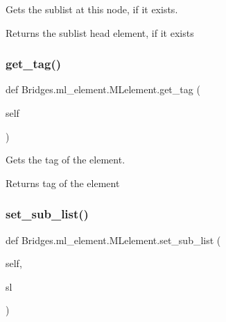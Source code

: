 Gets the sublist at this node, if it exists. 

\begin{DoxyReturn}{Returns}
the sublist head element, if it exists 
\end{DoxyReturn}
\mbox{\label{class_bridges_1_1ml__element_1_1_m_lelement_a4657bdb7c765e5c0dac5e14fb6a61153}} 
\subsubsection{\texorpdfstring{get\+\_\+tag()}{get\_tag()}}
{\footnotesize\ttfamily def Bridges.\+ml\+\_\+element.\+M\+Lelement.\+get\+\_\+tag (\begin{DoxyParamCaption}\item[{}]{self }\end{DoxyParamCaption})}



Gets the tag of the element. 

\begin{DoxyReturn}{Returns}
tag of the element 
\end{DoxyReturn}
\mbox{\label{class_bridges_1_1ml__element_1_1_m_lelement_ae1d401e972853ffab974aaa1dd44ab0e}} 
\subsubsection{\texorpdfstring{set\+\_\+sub\+\_\+list()}{set\_sub\_list()}}
{\footnotesize\ttfamily def Bridges.\+ml\+\_\+element.\+M\+Lelement.\+set\+\_\+sub\+\_\+list (\begin{DoxyParamCaption}\item[{}]{self,  }\item[{}]{sl }\end{DoxyParamCaption})}



